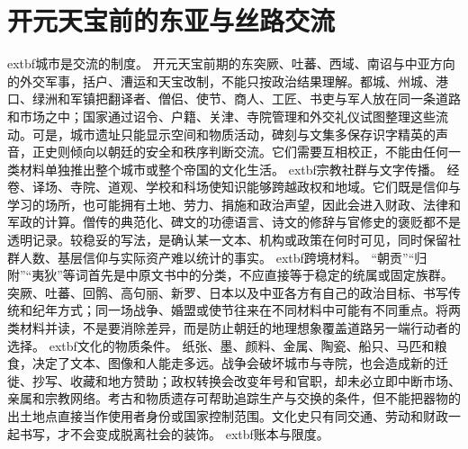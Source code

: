 \section{开元天宝前的东亚与丝路交流} \label{sec:kaiyuan-east-asian-silk-road}  \noindent	extbf{城市是交流的制度。} 开元天宝前期的东突厥、吐蕃、西域、南诏与中亚方向的外交军事，括户、漕运和天宝改制，不能只按政治结果理解。都城、州城、港口、绿洲和军镇把翻译者、僧侣、使节、商人、工匠、书吏与军人放在同一条道路和市场之中；国家通过诏令、户籍、关津、寺院管理和外交礼仪试图整理这些流动。可是，城市遗址只能显示空间和物质活动，碑刻与文集多保存识字精英的声音，正史则倾向以朝廷的安全和秩序判断交流。它们需要互相校正，不能由任何一类材料单独推出整个城市或整个帝国的文化生活。  \noindent	extbf{宗教社群与文字传播。} 经卷、译场、寺院、道观、学校和科场使知识能够跨越政权和地域。它们既是信仰与学习的场所，也可能拥有土地、劳力、捐施和政治声望，因此会进入财政、法律和军政的计算。僧传的典范化、碑文的功德语言、诗文的修辞与官修史的褒贬都不是透明记录。较稳妥的写法，是确认某一文本、机构或政策在何时可见，同时保留社群人数、基层信仰与实际资产难以统计的事实。  \noindent	extbf{跨境材料。} “朝贡”“归附”“夷狄”等词首先是中原文书中的分类，不应直接等于稳定的统属或固定族群。突厥、吐蕃、回鹘、高句丽、新罗、日本以及中亚各方有自己的政治目标、书写传统和纪年方式；同一场战争、婚盟或使节往来在不同材料中可能有不同重点。将两类材料并读，不是要消除差异，而是防止朝廷的地理想象覆盖道路另一端行动者的选择。  \noindent	extbf{文化的物质条件。} 纸张、墨、颜料、金属、陶瓷、船只、马匹和粮食，决定了文本、图像和人能走多远。战争会破坏城市与寺院，也会造成新的迁徙、抄写、收藏和地方赞助；政权转换会改变年号和官职，却未必立即中断市场、亲属和宗教网络。考古和物质遗存可帮助追踪生产与交换的条件，但不能把器物的出土地点直接当作使用者身份或国家控制范围。文化史只有同交通、劳动和财政一起书写，才不会变成脱离社会的装饰。  \noindent	extbf{账本与限度。} 